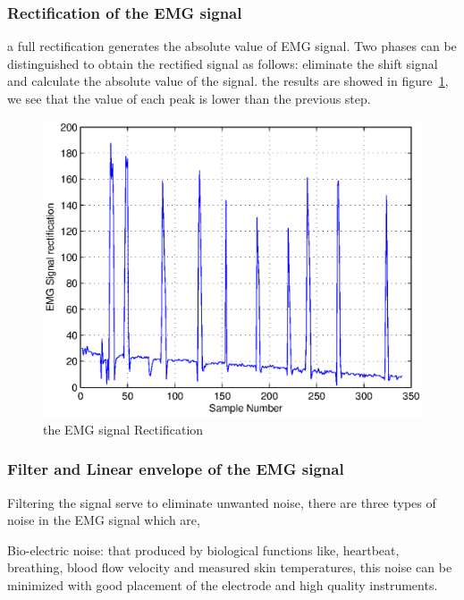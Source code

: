 \documentclass[conference]{IEEEtran}
\begin{document}
\subsubsection{Rectification of the EMG signal} \label{sub:RectificationtheEMGsignal}\par
a full rectification generates the absolute value of EMG signal. Two phases can be distinguished to obtain the rectified signal as follows: eliminate the shift signal and calculate the absolute value of the signal. the results are showed in figure~\ref{fig:rect}, 
we see that the value of each peak is lower than the previous step.\par

\begin{figure}
    \hspace*{1.2 cm}
    \includegraphics[scale=0.40]{Figures/rect1.eps}
    \caption{the EMG signal Rectification}
    \label{fig:rect}
\end{figure}

\subsubsection{Filter and Linear envelope of the EMG signal } \label{sub:LinearenvelopeoftheEMGsignal}\par
Filtering the signal serve to eliminate unwanted noise, there are three types of noise in the EMG signal which are, \par
Bio-electric noise: that produced by biological functions like, heartbeat, breathing, blood flow velocity and measured skin temperatures, this noise can be minimized with good placement of the electrode and high quality instruments.\par
\end{document}

